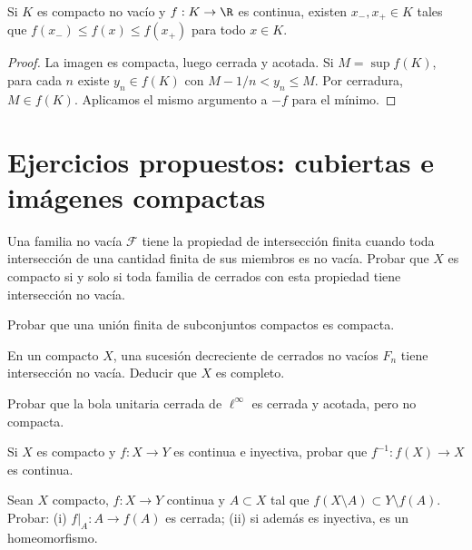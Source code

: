 \begin{corolario}\label{ch13:extremos}
Si $K$ es compacto no vacío y $f:K\to\R$ es continua, existen $x_-,x_+\in K$ tales que $f(x_-)\le f(x)\le f(x_+)$ para todo $x\in K$.
\end{corolario}
\begin{proof}
La imagen es compacta, luego cerrada y acotada. Si $M=\sup f(K)$, para cada $n$ existe $y_n\in f(K)$ con $M-1/n<y_n\le M$. Por cerradura, $M\in f(K)$. Aplicamos el mismo argumento a $-f$ para el mínimo.
\end{proof}

\section{Ejercicios propuestos: cubiertas e imágenes compactas}
\begin{ejercicio}\label{ej:lectura-13-1}
Una familia no vacía $\mathcal F$ tiene la propiedad de intersección finita cuando toda intersección de una cantidad finita de sus miembros es no vacía. Probar que $X$ es compacto si y solo si toda familia de cerrados con esta propiedad tiene intersección no vacía.
\end{ejercicio}


\begin{ejercicio}\label{ej:lectura-13-2}
Probar que una unión finita de subconjuntos compactos es compacta.
\end{ejercicio}


\begin{ejercicio}\label{ej:lectura-13-3}
En un compacto $X$, una sucesión decreciente de cerrados no vacíos $F_n$ tiene intersección no vacía. Deducir que $X$ es completo.
\end{ejercicio}


\begin{ejercicio}\label{ej:lectura-13-4}
Probar que la bola unitaria cerrada de $\ell^\infty$ es cerrada y acotada, pero no compacta.
\end{ejercicio}


\begin{ejercicio}\label{ej:lectura-13-5}
Si $X$ es compacto y $f:X\to Y$ es continua e inyectiva, probar que $f^{-1}:f(X)\to X$ es continua.
\end{ejercicio}


\begin{ejercicio}\label{ej:lectura-13-6}
Sean $X$ compacto, $f:X\to Y$ continua y $A\subset X$ tal que $f(X\setminus A)\subset Y\setminus f(A)$. Probar: (i) $f|_A:A\to f(A)$ es cerrada; (ii) si además es inyectiva, es un homeomorfismo.
\end{ejercicio}


